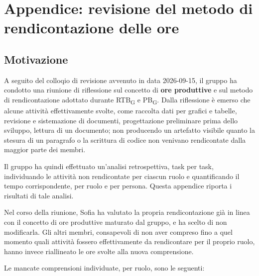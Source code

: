 \section{Appendice: revisione del metodo di rendicontazione delle ore}
\label{sec:appendice-rendicontazione}

\subsection{Motivazione}

A seguito del colloqio di revisione avvenuto in data 2026-09-15, il
gruppo ha condotto una riunione di riflessione sul concetto di \textbf{ore
produttive} e sul metodo di rendicontazione adottato durante RTB\textsubscript{G} e
PB\textsubscript{G}. Dalla riflessione è emerso che alcune attività effettivamente svolte,
 come raccolta dati per grafici e tabelle, revisione e
sistemazione di documenti, progettazione preliminare prima dello sviluppo,
lettura di un documento; non producendo un artefatto visibile quanto la stesura di un paragrafo o 
la scrittura di codice non venivano rendicontate dalla maggior parte dei membri.

Il gruppo ha quindi effettuato un'analisi retrospettiva, task per task,
individuando le attività non rendicontate per ciascun ruolo e quantificando
il tempo corrispondente, per ruolo e per persona. Questa appendice riporta
i risultati di tale analisi.

Nel corso della riunione, Sofia ha valutato la propria rendicontazione già
in linea con il concetto di ore produttive maturato dal gruppo, e ha
scelto di non modificarla. Gli altri membri, consapevoli di non aver
compreso fino a quel momento quali attività fossero effettivamente da
rendicontare per il proprio ruolo, hanno invece riallineato le ore svolte
alla nuova comprensione. 

Le mancate comprensioni individuate, per ruolo,
sono le seguenti:

